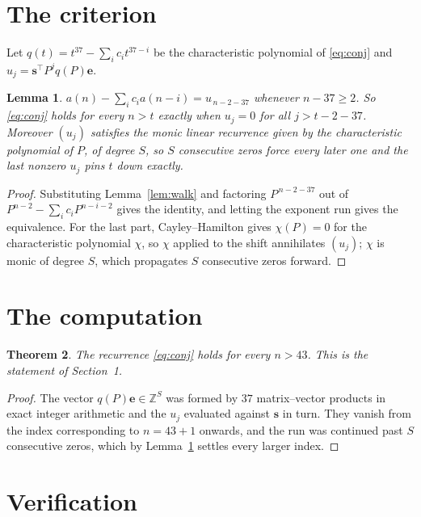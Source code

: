 \documentclass[11pt,a4paper]{article}
\theoremstyle{plain}
\newtheorem{theorem}{Theorem}
\newtheorem{lemma}[theorem]{Lemma}
\theoremstyle{definition}
\begin{document}
\section{The criterion}

Let $q(t)=t^{37}-\sum_i c_i t^{37-i}$ be the characteristic polynomial of
\eqref{eq:conj} and $u_j=\mathbf{s}^{\!\top}P^{j}q(P)\mathbf{e}$.

\begin{lemma}\label{lem:crit}
$a(n)-\sum_i c_i a(n-i)=u_{\,n-2-37}$ whenever $n-37\ge2$. So \eqref{eq:conj}
holds for every $n>t$ exactly when $u_j=0$ for all $j>t-2-37$. Moreover $(u_j)$
satisfies the monic linear recurrence given by the characteristic polynomial of $P$, of
degree $S$, so $S$ consecutive zeros force every later one and the last nonzero $u_j$ pins
$t$ down exactly.
\end{lemma}

\begin{proof}
Substituting Lemma~\ref{lem:walk} and factoring $P^{\,n-2-37}$ out of
$P^{n-2}-\sum_i c_i P^{n-i-2}$ gives the identity, and letting the exponent run gives the
equivalence. For the last part, Cayley--Hamilton gives $\chi(P)=0$ for the characteristic
polynomial $\chi$, so $\chi$ applied to the shift annihilates $(u_j)$; $\chi$ is monic of
degree $S$, which propagates $S$ consecutive zeros forward.
\end{proof}

\section{The computation}

\begin{theorem}
The recurrence \eqref{eq:conj} holds for every $n>43$. This is the statement of
Section~1.
\end{theorem}

\begin{proof}
The vector $q(P)\mathbf{e}\in\mathbb{Z}^{S}$ was formed by $37$ matrix--vector
products in exact integer arithmetic and the $u_j$ evaluated against $\mathbf{s}$ in turn.
They vanish from the index corresponding to $n=43+1$ onwards, and the run was continued
past $S$ consecutive zeros, which by Lemma~\ref{lem:crit} settles every larger index.
\end{proof}

\section{Verification}
\end{document}

